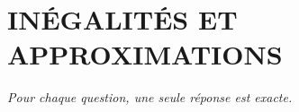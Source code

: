 
\section*{\textcolor{chapcolor}{\MakeUppercase{Inégalités et approximations}}}

\begin{center}
\textit{Pour chaque question, une seule réponse est exacte.}
\end{center}

